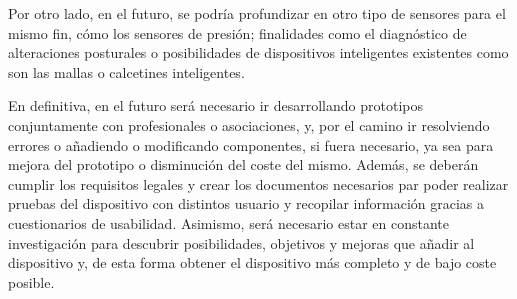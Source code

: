 Por otro lado, en el futuro, se podría profundizar en otro tipo de sensores para el mismo fin, cómo los sensores de presión; finalidades como el diagnóstico de alteraciones posturales o posibilidades de dispositivos inteligentes existentes como son las mallas o calcetines inteligentes. 

En definitiva, en el futuro será necesario ir desarrollando prototipos conjuntamente con profesionales o asociaciones, y, por el camino ir resolviendo errores o añadiendo o modificando componentes, si fuera necesario, ya sea para mejora del prototipo o disminución del coste del mismo. Además, se deberán cumplir los requisitos legales y crear los documentos necesarios par poder realizar pruebas del dispositivo con distintos usuario y recopilar información gracias a cuestionarios de usabilidad. Asimismo, será necesario estar en constante investigación para descubrir posibilidades, objetivos y mejoras que añadir al dispositivo y, de esta forma obtener el dispositivo más completo y de bajo coste posible.

